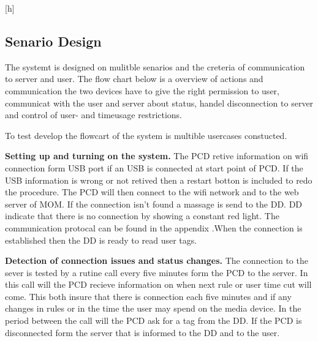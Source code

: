 \begin{center}[h]
\subsection{Senario Design}

The systemt is designed on mulitble senarios and the creteria of communication to server and user. The flow chart below is a overview of actions and communication the two devices have to give the right permission to user, communicat with the user and server about status, handel disconnection to server and control of user- and timeusage restrictions.\newline


To test develop the flowcart of the system is multible usercases constucted.\newline


\textbf{Setting up and turning on the system.} \newline
The PCD retive information on wifi connection form USB port if an USB is connected at start point of PCD. 
If the USB information is wrong or not retived then a restart botton is included to redo the procedure.  \newline
The PCD will then connect to the wifi network and to the web server of MOM. If the connection isn't found a massage is send to the DD. \newline DD indicate that there is no connection by showing a constant red light. The communication protocal can be found in the appendix  .\newline When the connection is established then the DD is ready to read user tags.\newline

\textbf{Detection of connection issues and status changes.} \newline
The connection to the sever is tested by a rutine call every five minutes form the PCD to the server. In this call will the PCD recieve information on when next rule or user time cut will come. This both insure that there is connection each five minutes and if any changes in rules or in the time the user may spend on the media device. In the period between the call will the PCD ask for a tag from the DD. If the PCD is disconnected form the server that is informed to the DD and to the user.  \newline
	

\end{center}
